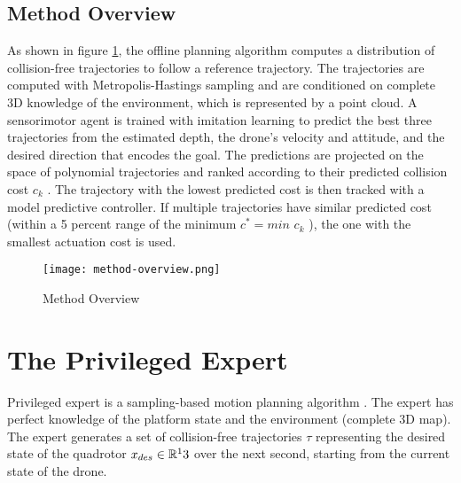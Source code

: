 \subsection{Method Overview}
As shown in figure \ref{fig:method-overview}, the offline planning algorithm computes a distribution of collision-free trajectories to follow a reference trajectory. The trajectories are computed with Metropolis-Hastings \cite{MH_hasting} sampling and are conditioned on complete 3D knowledge of the environment, which is represented by a point cloud. A sensorimotor agent is trained with imitation learning to predict the best three trajectories from the estimated depth, the drone’s velocity and attitude, and the desired direction that encodes the goal. The predictions are projected on the space of polynomial trajectories and ranked according to their predicted collision cost $c_k$ . The trajectory with the lowest predicted cost is then tracked with a model predictive controller. If multiple trajectories have similar predicted cost (within a 5 percent range of the minimum $c^* = min$ $c_k$ ), the one with the smallest actuation cost is used.

\begin{figure}[!h]
	\centering
	\texttt{[image: method-overview.png]}
	\caption{Method Overview}
	\label{fig:method-overview}
\end{figure}

\section{The Privileged Expert} 
Privileged expert is a sampling-based motion planning algorithm \cite{MH_hasting}. The expert has perfect knowledge of the platform state and the environment (complete 3D map). The expert generates a set of collision-free trajectories $\tau$ representing the desired state of the quadrotor $x_{des} \in \mathbb{R}^13$ over the next second, starting from the current state of the drone.

